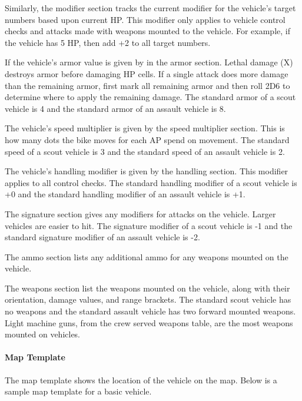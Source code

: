 Similarly, the modifier section tracks the current modifier for the vehicle's target numbers based upon current HP.
This modifier only applies to vehicle control checks and attacks made with weapons mounted to the vehicle.
For example, if the vehicle has 5 HP, then add +2 to all target numbers.

If the vehicle's armor value is given by in the armor section.
Lethal damage (X) destroys armor before damaging HP cells.
If a single attack does more damage than the remaining armor, first mark all remaining armor and then roll 2D6 to determine where to apply the remaining damage.
The standard armor of a scout vehicle is 4 and the standard armor of an assault vehicle is 8.

The vehicle's speed multiplier is given by the speed multiplier section.
This is how many dots the bike moves for each AP spend on movement.
The standard speed of a scout vehicle is 3 and the standard speed of an assault vehicle is 2.

The vehicle's handling modifier is given by the handling section.
This modifier applies to all control checks.
The standard handling modifier of a scout vehicle is +0 and the standard handling modifier of an assault vehicle is +1.

The signature section gives any modifiers for attacks on the vehicle.
Larger vehicles are easier to hit.
The signature modifier of a scout vehicle is -1 and the standard signature modifier of an assault vehicle is -2.

The ammo section lists any additional ammo for any weapons mounted on the vehicle.

The weapons section list the weapons mounted on the vehicle, along with their orientation, damage values, and range brackets.
The standard scout vehicle has no weapons and the standard assault vehicle has two forward mounted weapons.
Light machine guns, from the crew served weapons table, are the most weapons mounted on vehicles.

\paragraph*{Map Template}

The map template shows the location of the vehicle on the map.
Below is a sample map template for a basic vehicle.

